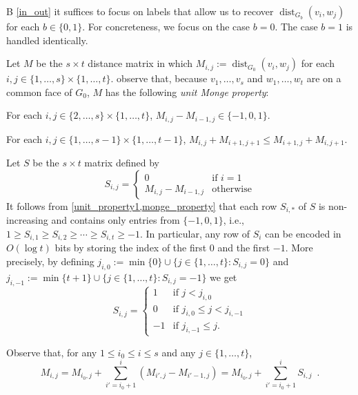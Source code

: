 \documentclass{patmorin}
\DeclareMathOperator{\dist}{dist}
\begin{document}
B \cref{in_out} it suffices to focus on labels that allow us to recover $\dist_{G_b}(v_i,w_j)$ for each $b\in\{0,1\}$.  For concreteness, we focus on the case $b=0$. The case $b=1$ is handled identically.

Let $M$ be the $s\times t$ distance matrix in which $M_{i,j}:=\dist_{G_0}(v_i,w_j)$ for each $i,j\in\{1,\ldots,s\}\times\{1,\ldots,t\}$.  \citet{abboud.gawrychowski.ea:near-optimal} observe that, because $v_1,\ldots,v_s$ and $w_1,\ldots,w_t$ are on a common face of $G_0$,  $M$ has the following \emph{unit Monge property}:
\begin{compactenum}[(UM1)]
    \item For each $i,j\in\{2,\ldots,s\}\times\{1,\ldots,t\}$, $M_{i,j}-M_{i-1,j} \in \{-1,0,1\}$.\label{unit_property1}
    \item For each $i,j\in\{1,\ldots,s-1\}\times\{1,\ldots,t-1\}$, $M_{i,j}+M_{i+1,j+1} \le M_{i+1,j} + M_{i,j+1}$.\label{monge_property}
\end{compactenum}

Let $S$ be the $s\times t$ matrix defined by
\begin{equation}
    S_{i,j}=\begin{cases}
                0 & \text{if $i=1$} \\
                M_{i,j}-M_{i-1,j} & \text{otherwise}
            \end{cases}  \label{s_definition}
\end{equation}
It follows from \cref{unit_property1,monge_property} that each row $S_{i,*}$ of $S$ is non-increasing and contains only entries from $\{-1,0,1\}$, i.e., $1\ge S_{i,1}\ge S_{i,2}\ge\cdots\ge S_{i,t}\ge -1$. In particular, any row of $S_i$ can be encoded in $O(\log t)$ bits by storing the index of the first $0$ and the first $-1$.  More precisely, by defining  $j_{i,0}:=\min\{0\}\cup\{j\in\{1,\ldots,t\}:S_{i,j}=0\}$ and $j_{i,-1}:=\min\{t+1\}\cup\{j\in\{1,\ldots,t\}:S_{i,j}=-1\}$ we get
\[
    S_{i,j} = \begin{cases}
        1 & \text{if $j < j_{i,0}$} \\
        0 & \text{if $j_{i,0}\le j < j_{i,-1}$} \\
        -1 & \text{if $j_{i,-1}\le j$.}
    \end{cases}
\]

Observe that, for any $1\le i_0\le i\le s$ and any $j\in\{1,\ldots,t\}$,
\begin{equation}\label{recovery}
   M_{i,j} = M_{i_0,j} + \sum_{i'=i_0+1}^i (M_{i',j}-M_{i'-1,j}) = M_{i_0,j} + \sum_{i'=i_0+1}^i S_{i,j} \enspace .
\end{equation}
\end{document}
